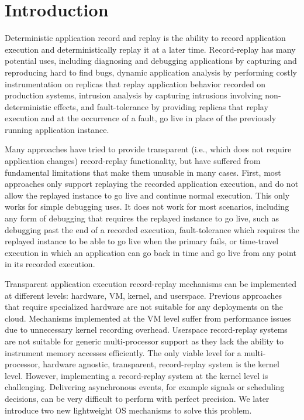\chapter{Introduction}
\label{ch:intro}

Deterministic application record and replay is the ability to record application
execution and deterministically replay it at a later time.  Record-replay has
many potential uses, including diagnosing and debugging applications by
capturing and reproducing hard to find bugs, dynamic application analysis by
performing costly instrumentation on replicas that replay application behavior
recorded on production systems, intrusion analysis by capturing intrusions
involving non-deterministic effects, and fault-tolerance by providing replicas
that replay execution and at the occurrence of a fault, go live in place of the
previously running application instance.

Many approaches have tried to provide transparent (i.e., which does not require
application changes) record-replay functionality, but have suffered from
fundamental limitations that make them unusable in many cases.  First, most
approaches only support replaying the recorded application execution, and do not
allow the replayed instance to go live and continue normal execution.  This only
works for simple debugging uses.  It does not work for most scenarios, including
any form of debugging that requires the replayed instance to go live, such as
debugging past the end of a recorded execution, fault-tolerance which requires
the replayed instance to be able to go live when the primary fails, or
time-travel execution in which an application can go back in time and go live
from any point in its recorded execution.

Transparent application execution record-replay mechanisms can be implemented at different levels:
hardware, VM, kernel, and userspace. Previous approaches that require
specialized hardware are not suitable for any deployments on the cloud.
Mechanisms implemented at the VM level suffer from performance issues
due to unnecessary kernel recording overhead.  Userspace record-replay systems
are not suitable for generic multi-processor support as they lack the ability to
instrument memory accesses efficiently. The only viable level for
a multi-processor, hardware agnostic, transparent, record-replay system is the
kernel level. However, implementing a record-replay system at the kernel level
is challenging. Delivering asynchronous events, for example signals or
scheduling decisions, can be very difficult to perform with perfect precision.
We later introduce two new lightweight OS mechanisms to solve this problem.

